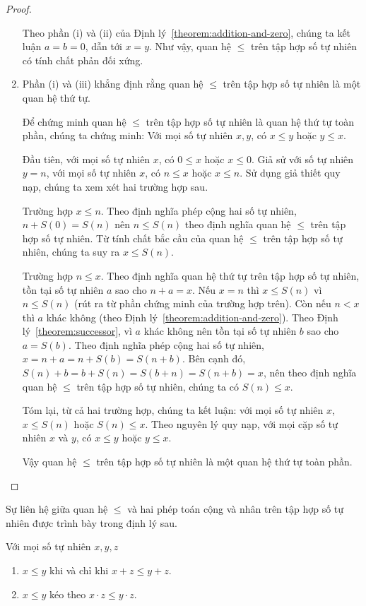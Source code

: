 \begin{proof}
\begin{enumerate}[label={(\roman*)}]
		      Theo phần (i) và (ii) của Định lý~\ref{theorem:addition-and-zero}, chúng ta kết luận $a = b = 0$, dẫn tới $x = y$. Như vậy, quan hệ $\leq$ trên tập hợp số tự nhiên có tính chất phản đối xứng.
		\item Phần (i) và (iii) khẳng định rằng quan hệ $\leq$ trên tập hợp số tự nhiên là một quan hệ thứ tự.

		      Để chứng minh quan hệ $\leq$ trên tập hợp số tự nhiên là quan hệ thứ tự toàn phần, chúng ta chứng minh: Với mọi số tự nhiên $x, y$, có $x\leq y$ hoặc $y\leq x$.

		      Đầu tiên, với mọi số tự nhiên $x$, có $0\leq x$ hoặc $x\leq 0$. Giả sử với số tự nhiên $y = n$, với mọi số tự nhiên $x$, có $n\leq x$ hoặc $x\leq n$. Sử dụng giả thiết quy nạp, chúng ta xem xét hai trường hợp sau.

		      Trường hợp $x\leq n$. Theo định nghĩa phép cộng hai số tự nhiên, $n + S(0) = S(n)$ nên $n\leq S(n)$ theo định nghĩa quan hệ $\leq$ trên tập hợp số tự nhiên. Từ tính chất bắc cầu của quan hệ $\leq$ trên tập hợp số tự nhiên, chúng ta suy ra $x\leq S(n)$.

		      Trường hợp $n\leq x$. Theo định nghĩa quan hệ thứ tự trên tập hợp số tự nhiên, tồn tại số tự nhiên $a$ sao cho $n + a = x$. Nếu $x = n$ thì $x\leq S(n)$ vì $n\leq S(n)$ (rút ra từ phần chứng minh của trường hợp trên). Còn nếu $n < x$ thì $a$ khác không (theo Định lý~\ref{theorem:addition-and-zero}). Theo Định lý~\ref{theorem:successor}, vì $a$ khác không nên tồn tại số tự nhiên $b$ sao cho $a = S(b)$. Theo định nghĩa phép cộng hai số tự nhiên, $x = n + a = n + S(b) = S(n + b)$. Bên cạnh đó, $S(n) + b = b + S(n) = S(b + n) = S(n + b) = x$, nên theo định nghĩa quan hệ $\leq$ trên tập hợp số tự nhiên, chúng ta có $S(n)\leq x$.

		      Tóm lại, từ cả hai trường hợp, chúng ta kết luận: với mọi số tự nhiên $x$, $x\leq S(n)$ hoặc $S(n)\leq x$. Theo nguyên lý quy nạp, với mọi cặp số tự nhiên $x$ và $y$, có $x\leq y$ hoặc $y\leq x$.

		      Vậy quan hệ $\leq$ trên tập hợp số tự nhiên là một quan hệ thứ tự toàn phần.\qedhere
	\end{enumerate}
\end{proof}

Sự liên hệ giữa quan hệ $\leq$ và hai phép toán cộng và nhân trên tập hợp số tự nhiên được trình bày trong định lý sau.
\begin{theorem}\label{theorem:natural-numbers-order}
	Với mọi số tự nhiên $x, y, z$
	\begin{enumerate}[label={(\roman*)}]
		\item $x\leq y$ khi và chỉ khi $x + z\leq y + z$.
		\item $x\leq y$ kéo theo $x\cdot z\leq y\cdot z$.
	\end{enumerate}
\end{theorem}

